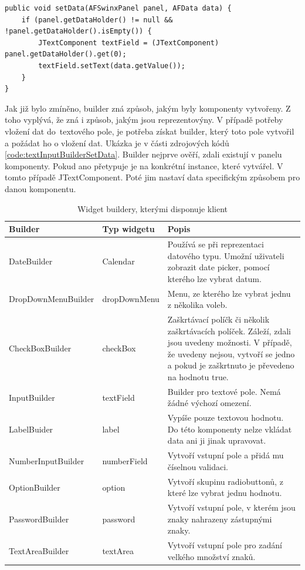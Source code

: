 \begin{lstlisting}[caption={Vložení dat do vstupního pole vytvořeného builderem.},
label={code:textInputBuilderSetData}, basicstyle=\footnotesize]
public void setData(AFSwinxPanel panel, AFData data) {
	if (panel.getDataHolder() != null && !panel.getDataHolder().isEmpty()) {
		JTextComponent textField = (JTextComponent) panel.getDataHolder().get(0);
		textField.setText(data.getValue());
	}
}
\end{lstlisting}

Jak již bylo zmíněno, builder zná způsob, jakým byly komponenty vytvořeny. Z toho vyplývá, že zná i způsob, jakým jsou reprezentovýny. V případě potřeby vložení dat do~textového pole, je potřeba získat builder, který toto pole vytvořil a požádat ho o vložení dat. Ukázka je v části zdrojových kódů \ref{code:textInputBuilderSetData}. Builder nejprve ověří, zdali existují v panelu komponenty. Pokud ano přetypuje je na konkrétní instance, které vytvářel. V tomto případě JTextComponent. Poté jim nastaví data specifickým způsobem pro danou komponentu.

\begin{table}[width=\linewidth]
\begin{center}
\caption{Widget buildery, kterými disponuje klient}
\label{table:widgetBuilders}
\begin{tabular}{|p{4cm}|p{3cm}|p{7cm}|}
\hline
\textbf{Builder} & \textbf{Typ widgetu} & \textbf{Popis} \\
\hline
DateBuilder & 
Calendar & Používá se při reprezentaci datového typu. Umožní uživateli zobrazit date picker, pomocí kterého lze vybrat datum. \\
\hline
DropDownMenuBuilder &
dropDownMenu & Menu, ze kterého lze vybrat jednu z několika voleb. \\
\hline
CheckBoxBuilder & checkBox &
Zaškrtávací políčk či několik zaškrtávacích políček. Záleží, zdali jsou uvedeny možnosti. V případě, že uvedeny nejsou, vytvoří se jedno a pokud je zaškrtnuto je převedeno na hodnotu true. \\
\hline
InputBuilder & textField &
Builder pro textové pole. Nemá žádné výchozí omezení. \\
\hline
LabelBuider & label &
Vypíše pouze textovou hodnotu. Do této komponenty nelze vkládat data ani ji jinak upravovat. \\
\hline
NumberInputBuilder & numberField &
Vytvoří vstupní pole a přidá mu číselnou validaci. \\
\hline
OptionBuilder & option &
Vytvoří skupinu radiobuttonů, z které lze vybrat jednu hodnotu. \\
\hline
PasswordBuilder & password &
Vytvoří vstupní pole, v kterém jsou znaky nahrazeny zástupnými znaky. \\
\hline
TextAreaBuilder & textArea &
Vytvoří vstupní pole pro zadání velkého množství znaků. \\
\hline
\end{tabular}
\end{center}
\end{table}


